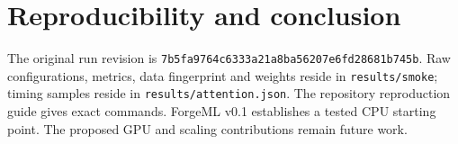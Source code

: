 \documentclass[11pt]{article}
\begin{document}
\section{Reproducibility and conclusion}
The original run revision is \texttt{7b5fa9764c6333a21a8ba56207e6fd28681b745b}. Raw configurations, metrics, data fingerprint and weights reside in \texttt{results/smoke}; timing samples reside in \texttt{results/attention.json}. The repository reproduction guide gives exact commands. ForgeML v0.1 establishes a tested CPU starting point. The proposed GPU and scaling contributions remain future work.


\end{document}

